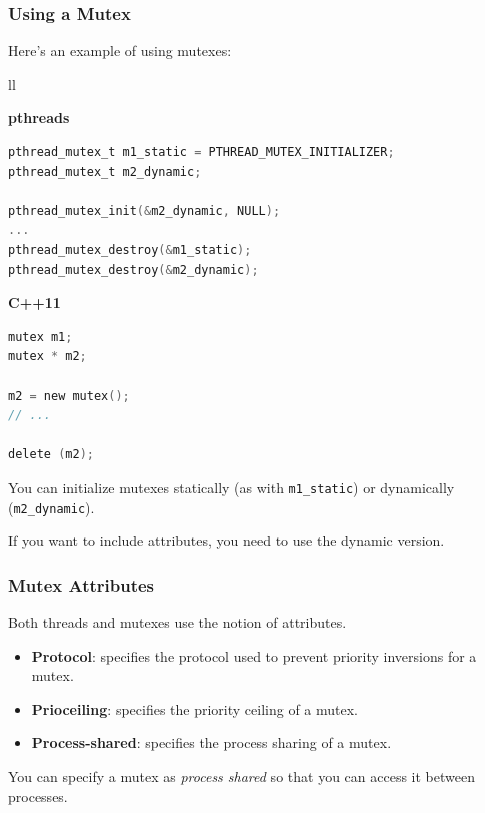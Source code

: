 \begin{frame}[fragile]
\frametitle{Using a Mutex}

  Here's an example of using mutexes:
    
    \begin{tabular}{ll}
      \begin{minipage}{.65\textwidth}
        {\bf pthreads}
{\scriptsize
  \begin{lstlisting}[language=C]
pthread_mutex_t m1_static = PTHREAD_MUTEX_INITIALIZER;
pthread_mutex_t m2_dynamic;

pthread_mutex_init(&m2_dynamic, NULL);
...
pthread_mutex_destroy(&m1_static);
pthread_mutex_destroy(&m2_dynamic);
  \end{lstlisting}
  }
      \end{minipage}
      \begin{minipage}{.35\textwidth}

        {\bf C++11}
{\scriptsize
  \begin{lstlisting}[language=C]
mutex m1;
mutex * m2;

m2 = new mutex();
// ...

delete (m2);
  \end{lstlisting}
  }
      \end{minipage}
    \end{tabular}

You can initialize mutexes statically (as with {\tt m1\_static}) or
dynamically ({\tt m2\_dynamic}). 

If you want to include attributes,
you need to use the dynamic version.

\end{frame}



\begin{frame}
\frametitle{Mutex Attributes}

 Both threads and mutexes use the notion of attributes.
 

  \begin{itemize}
    \item {\bf Protocol}: specifies the protocol used to prevent priority
      inversions for a mutex.
    \item {\bf Prioceiling}: specifies the priority ceiling of a mutex.
    \item {\bf Process-shared}: specifies the process sharing of a mutex.
  \end{itemize}
  
  You can specify a mutex as {\it process shared} so that you can access it
  between processes.

\end{frame}


